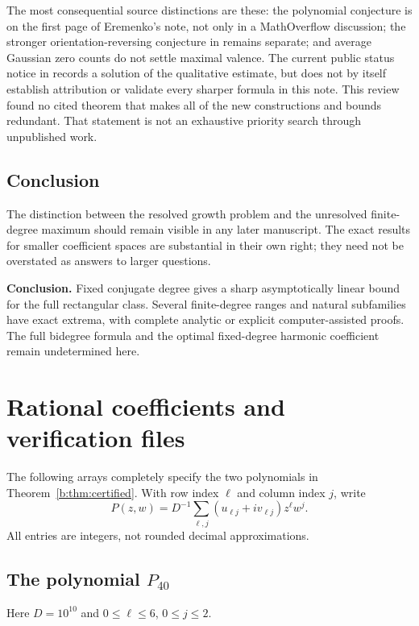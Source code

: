 \documentclass[UTF8,11pt]{ctexart}
\theoremstyle{definition}
\numberwithin{equation}{section}
\begin{document}
The most consequential source distinctions are these: the polynomial
conjecture is on the first page of Eremenko's note, not only in a
MathOverflow discussion; the stronger orientation-reversing conjecture
in \cite{LLL15} remains separate; and average Gaussian zero counts do not
settle maximal valence. The current public status notice in \cite{Ere26b}
records a solution of the qualitative estimate, but does not by itself
establish attribution or validate every sharper formula in this note.
This review found no cited theorem that makes all of the new constructions
and bounds redundant. That statement is not an exhaustive priority search
through unpublished work.

\subsection{Conclusion}
The distinction between the resolved growth problem and the unresolved
finite-degree maximum should remain visible in any later manuscript.
The exact results for smaller coefficient spaces are substantial in their
own right; they need not be overstated as answers to larger questions.

\begin{tcolorbox}[colback=MidnightBlue!4,colframe=MidnightBlue!50,sharp corners,boxrule=.5pt]
\textbf{Conclusion.} Fixed conjugate degree gives a sharp asymptotically
linear bound for the full rectangular class. Several finite-degree ranges
and natural subfamilies have exact extrema, with complete analytic or
explicit computer-assisted proofs. The full bidegree formula and the
optimal fixed-degree harmonic coefficient remain undetermined here.
\end{tcolorbox}

\appendix
\section{Rational coefficients and verification files}\label{b:app:coefficients}

The following arrays completely specify the two polynomials in
Theorem~\ref{b:thm:certified}. With row index $\ell$ and column index
$j$, write
\[
 P(z,w)=D^{-1}\sum_{\ell,j}(u_{\ell j}+i v_{\ell j})z^\ell w^j.
\]
All entries are integers, not rounded decimal approximations.

\subsection*{The polynomial \texorpdfstring{$P_{40}$}{P40}}
Here $D=10^{10}$ and $0\le\ell\le 6$, $0\le j\le2$.
\end{document}
